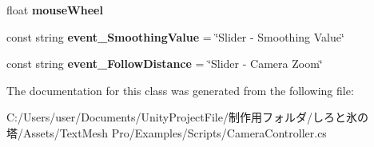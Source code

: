 \begin{DoxyCompactItemize}
float {\bfseries mouse\+Wheel}
\item 
\mbox{\label{class_t_m_pro_1_1_examples_1_1_camera_controller_afad7b776c032f00b6ea912bc0a3fdd3a}} 
const string {\bfseries event\+\_\+\+Smoothing\+Value} = \char`\"{}Slider -\/ Smoothing Value\char`\"{}
\item 
\mbox{\label{class_t_m_pro_1_1_examples_1_1_camera_controller_aa11c6325e2887eb4939340b36a86f07e}} 
const string {\bfseries event\+\_\+\+Follow\+Distance} = \char`\"{}Slider -\/ Camera Zoom\char`\"{}
\end{DoxyCompactItemize}


The documentation for this class was generated from the following file\+:\begin{DoxyCompactItemize}
\item 
C\+:/\+Users/user/\+Documents/\+Unity\+Project\+File/制作用フォルダ/しろと氷の塔/\+Assets/\+Text\+Mesh Pro/\+Examples/\+Scripts/Camera\+Controller.\+cs\end{DoxyCompactItemize}

